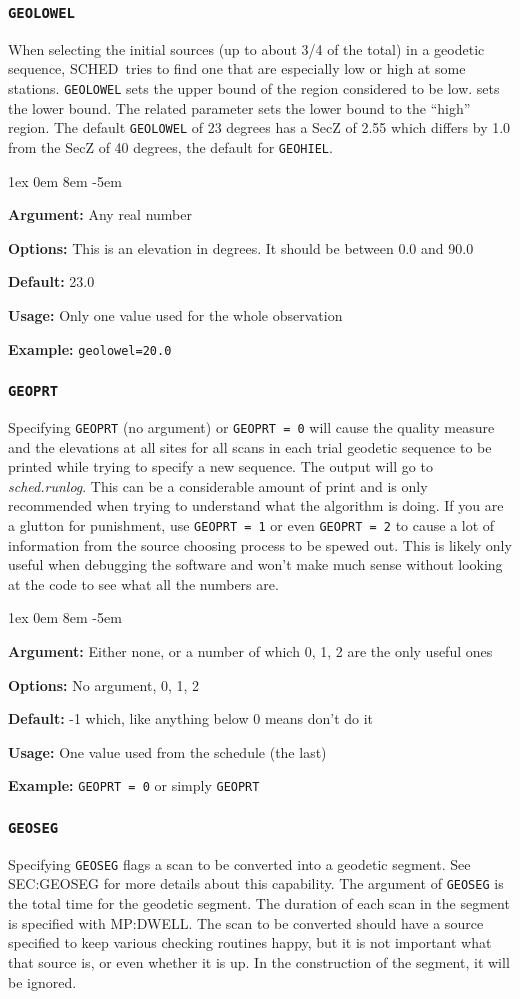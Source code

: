 \documentclass{report}
\newcommand{\schedb}{{\sc SCHED~}}
\newcommand{\rcwbox}[5]{
  \begin{list}{}{\parsep 1ex  \itemsep 0em
                 \leftmargin 8em  \itemindent -5em }
    \item {\bf Argument:} #1
    \item {\bf Options:}  #2
    \item {\bf Default:}  #3
    \item {\bf Usage:}    #4
    \item {\bf Example:}  #5
  \end{list}
}
\begin{document}
\subsubsection{\label{MP:GEOLOWEL}{\tt GEOLOWEL}}

When selecting the initial sources (up to about 3/4 of the total)
in a geodetic sequence, \schedb tries to find one that are especially
low or high at some stations.  {\tt GEOLOWEL} sets the upper bound
of the region considered to be low.  
sets the lower bound.  The related parameter
 sets the lower bound to the
``high'' region.  The default {\tt GEOLOWEL} of 23 degrees has a
SecZ of 2.55 which differs by 1.0 from the SecZ of 40 degrees, the
default for {\tt GEOHIEL}.

\rcwbox
{Any real number}
{This is an elevation in degrees.  It should be between 0.0 and 90.0}
{23.0}
{Only one value used for the whole observation}
{{\tt geolowel=20.0}}

\subsubsection{\label{MP:GEOPRT}{\tt GEOPRT}}

Specifying {\tt GEOPRT} (no argument) or {\tt GEOPRT = 0}
will cause the quality measure and the elevations at all sites for all
scans in each trial geodetic sequence to be printed while trying to
specify a new sequence.  The output will go to {\sl sched.runlog}. 
This can be a considerable amount of print
and is only recommended when trying to understand what the algorithm
is doing.  If you are a glutton for punishment, use {\tt GEOPRT = 1}
or even {\tt GEOPRT = 2} to cause a lot of information from the source
choosing process to be spewed out.  This is likely only useful when
debugging the software and won't make much sense without looking at
the code to see what all the numbers are.

\rcwbox
{Either none, or a number of which 0, 1, 2 are the only useful ones}
{No argument, 0, 1, 2}
{-1 which, like anything below 0 means don't do it}
{One value used from the schedule (the last)}
{{\tt GEOPRT = 0} or simply {\tt GEOPRT}}


\subsubsection{\label{MP:GEOSEG}{\tt GEOSEG}}

Specifying {\tt GEOSEG} flags a scan to be converted into a geodetic
segment.  See 
{SEC:GEOSEG} for more details about this capability.  The argument
of {\tt GEOSEG} is the total time for the geodetic segment.  The duration
of each scan in the segment is specified with 
{MP:DWELL}.  The scan to be converted should have a source specified
to keep various checking routines happy, but it is not important what
that source is, or even whether it is up.  In the construction of the
segment, it will be ignored.
\end{document}
